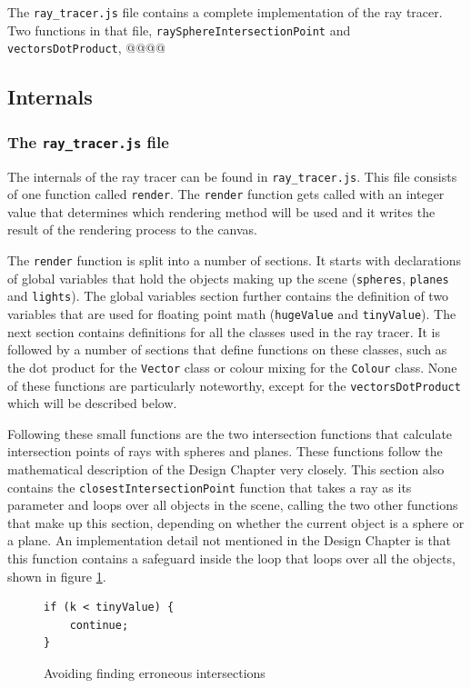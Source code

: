 \documentclass[11pt]{report}
\begin{document}
The \texttt{ray_tracer.js} file contains a complete implementation of the ray tracer. Two functions in that file, \texttt{raySphereIntersectionPoint} and \texttt{vectorsDotProduct}, @@@@

\subsection{Internals}
\subsubsection{The \texttt{ray_tracer.js} file}
The internals of the ray tracer can be found in \texttt{ray_tracer.js}. This file consists of one function called \texttt{render}. The \texttt{render} function gets called with an integer value that determines which rendering method will be used and it writes the result of the rendering process to the canvas.

The \texttt{render} function is split into a number of sections. It starts with declarations of global variables that hold the objects making up the scene (\texttt{spheres}, \texttt{planes} and \texttt{lights}). The global variables section further contains the definition of two variables that are used for floating point math (\texttt{hugeValue} and \texttt{tinyValue}). The next section contains definitions for all the classes used in the ray tracer. It is followed by a number of sections that define functions on these classes, such as the dot product for the \texttt{Vector} class or colour mixing for the \texttt{Colour} class. None of these functions are particularly noteworthy, except for the \texttt{vectorsDotProduct} which will be described below.

Following these small functions are the two intersection functions that calculate intersection points of rays with spheres and planes. These functions follow the mathematical description of the Design Chapter very closely. This section also contains the \texttt{closestIntersectionPoint} function that takes a ray as its parameter and loops over all objects in the scene, calling the two other functions that make up this section, depending on whether the current object is a sphere or a plane. An implementation detail not mentioned in the Design Chapter is that this function contains a safeguard inside the loop that loops over all the objects, shown in figure \ref{irenderer1}.

\begin{figure}[ht]
\begin{lstlisting}
if (k < tinyValue) {
    continue;
}
\end{lstlisting}
\caption{Avoiding finding erroneous intersections}
\label{irenderer1}
\end{figure}
\end{document}
